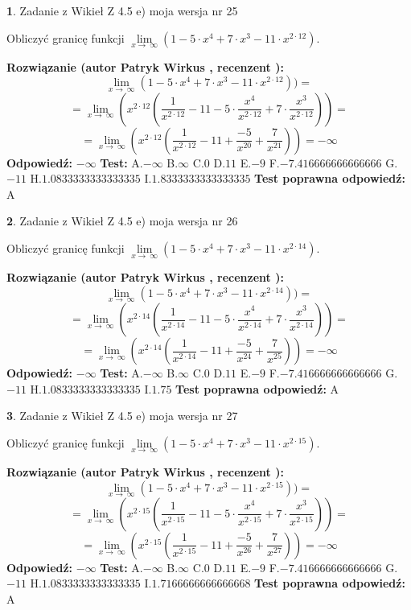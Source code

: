 \documentclass[12pt, a4paper]{article}
\theoremstyle{definition} %
\newtheorem{zad}{}
\newcommand{\zadStart}[1]{\begin{zad}#1\newline}
\newcommand{\zadStop}{\end{zad}}
\newcommand{\rozwStart}[2]{\noindent \textbf{Rozwiązanie (autor #1 , recenzent #2): }\newline}
\newcommand{\rozwStop}{\newline}
\newcommand{\odpStart}{\noindent \textbf{Odpowiedź:}\newline}
\newcommand{\odpStop}{\newline}
\newcommand{\testStart}{\noindent \textbf{Test:}\newline}
\newcommand{\testStop}{\newline}
\newcommand{\kluczStart}{\noindent \textbf{Test poprawna odpowiedź:}\newline}
\newcommand{\kluczStop}{\newline}
\begin{document}
\zadStart{Zadanie z Wikieł Z 4.5 e) moja wersja nr 25}


Obliczyć granicę funkcji  $\lim\limits_{x\to\ \infty}(1 - 5 \cdot x^{4}+7 \cdot x^{3}- 11 \cdot x^{2\cdot12})$.
\zadStop
\rozwStart{Patryk Wirkus}{}
$$\lim\limits_{x\to\ \infty}(1 - 5 \cdot x^{4}+7 \cdot x^{3}- 11 \cdot x^{2\cdot12}))=$$
$$=\lim\limits_{x\to\ \infty}(x^{2\cdot12}(\frac{1}{x^{2\cdot12}}-11 -5 \cdot \frac{x^{4}}{x^{2\cdot12}}+7 \cdot \frac{x^{3}}{x^{2\cdot12}}))=$$
$$=\lim\limits_{x\to\ \infty}(x^{2\cdot12}(\frac{1}{x^{2\cdot12}}-11 + \frac{-5}{x^{20}}+ \frac{7}{x^{21}}))=-\infty$$
\rozwStop
\odpStart
$-\infty$
\odpStop
\testStart
A.$-\infty$ B.$\infty$ C.$0$ D.$11$ E.$-9$
F.$-7.416666666666666$ G.$-11$
H.$1.0833333333333335$
I.$1.8333333333333335$
\testStop
\kluczStart
A
\kluczStop



\zadStart{Zadanie z Wikieł Z 4.5 e) moja wersja nr 26}


Obliczyć granicę funkcji  $\lim\limits_{x\to\ \infty}(1 - 5 \cdot x^{4}+7 \cdot x^{3}- 11 \cdot x^{2\cdot14})$.
\zadStop
\rozwStart{Patryk Wirkus}{}
$$\lim\limits_{x\to\ \infty}(1 - 5 \cdot x^{4}+7 \cdot x^{3}- 11 \cdot x^{2\cdot14}))=$$
$$=\lim\limits_{x\to\ \infty}(x^{2\cdot14}(\frac{1}{x^{2\cdot14}}-11 -5 \cdot \frac{x^{4}}{x^{2\cdot14}}+7 \cdot \frac{x^{3}}{x^{2\cdot14}}))=$$
$$=\lim\limits_{x\to\ \infty}(x^{2\cdot14}(\frac{1}{x^{2\cdot14}}-11 + \frac{-5}{x^{24}}+ \frac{7}{x^{25}}))=-\infty$$
\rozwStop
\odpStart
$-\infty$
\odpStop
\testStart
A.$-\infty$ B.$\infty$ C.$0$ D.$11$ E.$-9$
F.$-7.416666666666666$ G.$-11$
H.$1.0833333333333335$
I.$1.75$
\testStop
\kluczStart
A
\kluczStop



\zadStart{Zadanie z Wikieł Z 4.5 e) moja wersja nr 27}


Obliczyć granicę funkcji  $\lim\limits_{x\to\ \infty}(1 - 5 \cdot x^{4}+7 \cdot x^{3}- 11 \cdot x^{2\cdot15})$.
\zadStop
\rozwStart{Patryk Wirkus}{}
$$\lim\limits_{x\to\ \infty}(1 - 5 \cdot x^{4}+7 \cdot x^{3}- 11 \cdot x^{2\cdot15}))=$$
$$=\lim\limits_{x\to\ \infty}(x^{2\cdot15}(\frac{1}{x^{2\cdot15}}-11 -5 \cdot \frac{x^{4}}{x^{2\cdot15}}+7 \cdot \frac{x^{3}}{x^{2\cdot15}}))=$$
$$=\lim\limits_{x\to\ \infty}(x^{2\cdot15}(\frac{1}{x^{2\cdot15}}-11 + \frac{-5}{x^{26}}+ \frac{7}{x^{27}}))=-\infty$$
\rozwStop
\odpStart
$-\infty$
\odpStop
\testStart
A.$-\infty$ B.$\infty$ C.$0$ D.$11$ E.$-9$
F.$-7.416666666666666$ G.$-11$
H.$1.0833333333333335$
I.$1.7166666666666668$
\testStop
\kluczStart
A
\kluczStop
\end{document}
